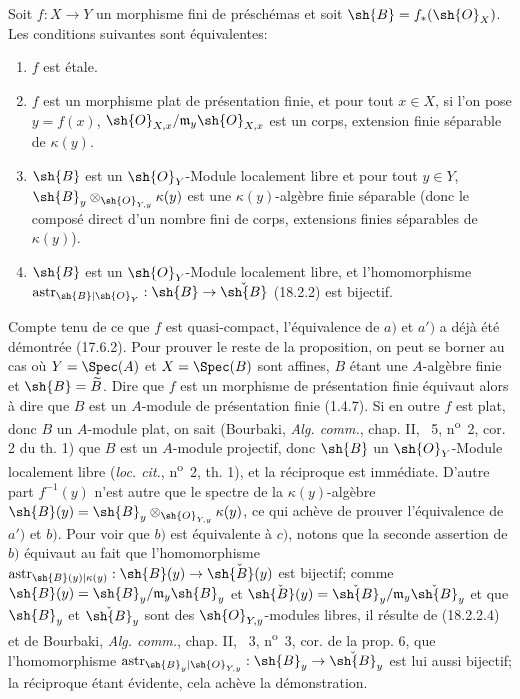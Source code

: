 
\begin{proposition}[18.2.3]
\label{IV.18.2.3}
Soit $f:X\to Y$ un morphisme fini de préschémas et soit $\sh{B}=f_*(\sh{O}_X)$. Les conditions suivantes sont équivalentes:
\begin{enumerate}
  \item[a)] $f$ est étale.
  \item[a$'$)] $f$ est un morphisme plat de présentation finie, et pour tout $x\in X$, si l'on pose $y=f(x)$, $\sh{O}_{X,x}/\mathfrak m_y\sh{O}_{X,x}$ est un corps, extension finie séparable de $\kappa(y)$.
  \item[b)] $\sh{B}$ est un $\sh{O}_Y$-Module localement libre et pour tout $y\in Y$, $\sh{B}_y\otimes_{\sh{O}_{Y,y}}\kappa(y)$ est une $\kappa(y)$-algèbre finie séparable (donc le composé direct d'un nombre fini de corps, extensions finies séparables de $\kappa(y)$).
  \item[c)] $\sh{B}$ est un $\sh{O}_Y$-Module localement libre, et l'homomorphisme $\operatorname{astr}_{\sh{B}|\sh{O}_Y}:\sh{B}\to\check{\sh{B}}$ (18.2.2) est bijectif.
\end{enumerate}
\end{proposition}

Compte tenu de ce que $f$ est quasi-compact, l'équivalence de $a)$ et $a')$ a déjà été démontrée (17.6.2). Pour prouver le reste de la proposition, on peut se borner au cas où $Y=\Spec(A)$ et $X=\Spec(B)$ sont affines, $B$ étant une $A$-algèbre finie et $\sh{B}=\widetilde B$. Dire que $f$ est un morphisme de présentation finie équivaut alors à dire que $B$ est un $A$-module de présentation finie (1.4.7). Si en outre $f$ est plat, donc $B$ un $A$-module plat, on sait (Bourbaki, \emph{Alg. comm.}, chap. II, \textsection~5, n\textsuperscript{o}~2, cor. 2 du th. 1) que $B$ est un $A$-module projectif, donc $\sh{B}$ un $\sh{O}_Y$-Module localement libre (\emph{loc. cit.}, n\textsuperscript{o}~2, th. 1), et la réciproque est immédiate. D'autre part $f^{-1}(y)$ n'est autre que le spectre de la $\kappa(y)$-algèbre $\sh{B}(y)=\sh{B}_y\otimes_{\sh{O}_{Y,y}}\kappa(y)$, ce qui achève de prouver l'équivalence de $a')$ et $b)$. Pour voir que $b)$ est équivalente à $c)$, notons que la seconde assertion de $b)$ équivaut au fait que l'homomorphisme $\operatorname{astr}_{\sh{B}(y)|\kappa(y)}:\sh{B}(y)\to\check{\sh{B}(y)}$ est bijectif; comme $\sh{B}(y)=\sh{B}_y/\mathfrak m_y\sh{B}_y$ et $\check{\sh{B}(y)}=\check{\sh{B}}_y/\mathfrak m_y\check{\sh{B}}_y$ et que $\sh{B}_y$ et $\check{\sh{B}}_y$ sont des $\sh{O}_{Y,y}$-modules libres, il résulte de (18.2.2.4) et de Bourbaki, \emph{Alg. comm.}, chap. II, \textsection~3, n\textsuperscript{o}~3, cor. de la prop. 6, que l'homomorphisme $\operatorname{astr}_{\sh{B}_y|\sh{O}_{Y,y}}:\sh{B}_y\to\check{\sh{B}}_y$ est lui aussi bijectif; la réciproque étant évidente, cela achève la démonstration.

